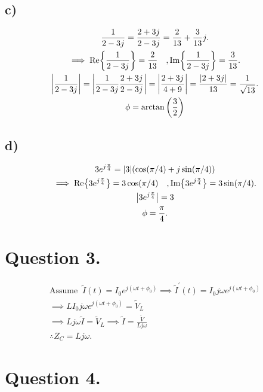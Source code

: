 \documentclass[
	12pt,
	]{article}
\newcommand{\p}{\prime}
\theoremstyle{definition}
\theoremstyle{definition}
\theoremstyle{definition}
\theoremstyle{definition}
\theoremstyle{definition}
\theoremstyle{example}
\theoremstyle{note}
\theoremstyle{remark}
\theoremstyle{example}
\begin{document}
			\subsection*{c) }
				\begin{gather*}
					\frac{1}{2-3j} = \frac{2+3j}{2-3j} = \frac{2}{13} + \frac{3}{13}j.\\
					\implies \Re{\frac{1}{2-3j}} = \frac{2}{13} \quad, \Im{\frac{1}{2-3j}} = \frac{3}{13}.\\
					\abs{\frac{1}{2-3j}} = \abs{\frac{1}{2-3j} \frac{2+3j}{2-3j}} = \abs{\frac{2+3j}{4+9}} = \frac{\abs{2+3j}}{13} = \frac{1}{\sqrt{13}}.\\
					\phi = \arctan \left(\frac32\right)
				\end{gather*}
			\subsection*{d) }
				\begin{gather*}
					3e^{j\frac{\pi}{4}} = \abs{3}(\cos(\pi/4) + j \sin(\pi/4))\\
					\implies \Re{3e^{j\frac{\pi}{4}}} = 3\cos(\pi/4) \quad , \Im{3e^{j\frac{\pi}{4}}} = 3\sin(\pi/4).\\
					\abs{3e^{j\frac{\pi}{4}}} = 3\\
					\phi = \frac{\pi}{4}.
				\end{gather*}
		\section*{Question 3.}
			\begin{gather*}
				\text{Assume } \ \widetilde{I}(t) = I_{0} e^{j(\omega t + \phi_{0})} \implies \widetilde{I}^{\p}(t) = I_{0}j\omega e^{j(\omega t + \phi_{0})}\\
				\implies LI_{0}j\omega e^{j(\omega t + \phi_{0})} = \widetilde{V}_{L} \\
				\implies Lj\omega \widetilde{I} = \widetilde{V}_{L} \implies \widetilde{I} = \frac{\widetilde{V}}{Lj\omega} \\
				\therefore Z_{C} = Lj\omega .
			\end{gather*}
		\section*{Question 4.}
\end{document}
